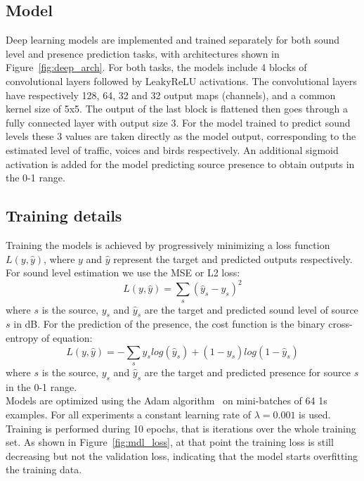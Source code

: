\documentclass[11pt,a4paper]{article}
\begin{document}
\subsection{Model}

Deep learning models are implemented and trained separately for both sound level and presence prediction tasks, with architectures shown in Figure~\ref{fig:deep_arch}. For both tasks, the models include 4 blocks of convolutional layers followed by LeakyReLU activations. The convolutional layers have respectively 128, 64, 32 and 32 output maps (channels), and a common kernel size of 5x5. The output of the last block is flattened then goes through a fully connected layer with output size 3. For the model trained to predict sound levels these 3 values are taken directly as the model output, corresponding to the estimated level of traffic, voices and birds respectively. An additional sigmoid activation is added for the model predicting source presence to obtain outputs in the 0-1 range.

\subsection{Training details}

Training the models is achieved by progressively minimizing a loss function $L(y, \hat y)$, where $y$ and $\hat y$ represent the target and predicted outputs respectively. For sound level estimation we use the MSE or L2 loss:
\begin{equation}
L(y, \hat y) = \sum_s \left(\hat y_s - y_s\right)^2
\end{equation}
where $s$ is the source, $y_s$ and $\hat y_s$ are the target and predicted sound level of source $s$ in dB. For the prediction of the presence, the cost function is the binary cross-entropy of equation:
\begin{equation}
L(y, \hat y) = -\sum_s y_s log\left(\hat y_s\right) + (1-y_s) log\left(1-\hat y_s\right)
\end{equation}
where $s$ is the source, $y_s$ and $\hat y_s$ are the target and predicted presence for source $s$ in the 0-1 range.\\

Models are optimized using the Adam algorithm~\cite{adam} on mini-batches of 64 1s examples. For all experiments a constant learning rate of $\lambda = 0.001$ is used. Training is performed during 10 epochs, that is iterations over the whole training set. As shown in Figure~\ref{fig:mdl_loss}, at that point the training loss is still decreasing but not the validation loss, indicating that the model starts overfitting the training data.
\end{document}
